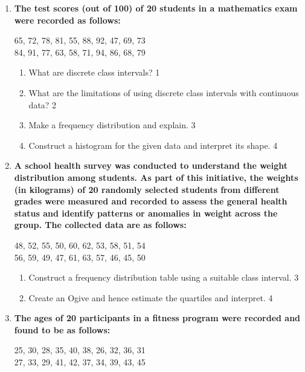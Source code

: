 \documentclass[a4paper,oneside]{book}
\begin{document}
\begin{enumerate}
  \item
\textbf{The test scores (out of 100) of 20 students in a mathematics exam were recorded as follows:}
\begin{center}
65, 72, 78, 81, 55, 88, 92, 47, 69, 73 \\
84, 91, 77, 63, 58, 71, 94, 86, 68, 79 
\end{center}

\begin{enumerate}
    \item
    What are discrete class intervals? \hfill 1
    \item
    What are the limitations of using discrete class intervals with continuous data? \hfill 2
    \item
    Make a frequency distribution and explain. \hfill 3
    \item  
    Construct a histogram for the given data and interpret its shape. \hfill 4
\end{enumerate}
  
  \item
  \textbf{A school health survey was conducted to understand the weight distribution among students. As part of this initiative, the weights (in kilograms) of 20 randomly selected students from different grades were measured and recorded to assess the general health status and identify patterns or anomalies in weight across the group. The collected data are as follows:}

  \begin{center}
  48, 52, 55, 50, 60, 62, 53, 58, 51, 54 \\
  56, 59, 49, 47, 61, 63, 57, 46, 45, 50 \\
  \end{center}

\begin{enumerate}
  \item  
  Construct a frequency distribution table using a suitable class interval. \hfill 3

  \item
  Create an Ogive and hence estimate the quartiles and interpret. \hfill 4
\end{enumerate}

  
  \item
  \textbf{The ages of 20 participants in a fitness program were recorded and found to be as follows:}
  \begin{center}
  25, 30, 28, 35, 40, 38, 26, 32, 36, 31 \\
  27, 33, 29, 41, 42, 37, 34, 39, 43, 45 \\
  \end{center}


\end{enumerate}
\end{document}
